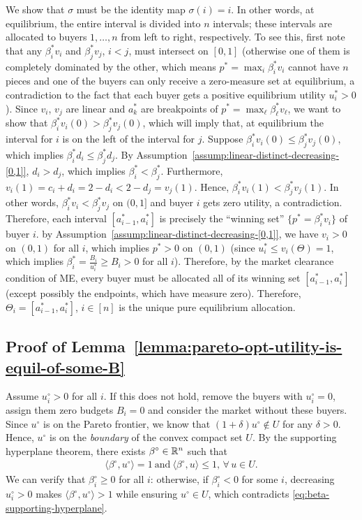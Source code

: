 		We show that $\sigma$ must be the identity map $\sigma(i) = i$. In other words, at equilibrium, the entire interval is divided into $n$ intervals; these intervals are allocated to buyers $1, \dots, n$ from left to right, respectively. To see this, first note that any $\beta^*_i v_i$ and $\beta^*_j v_j$, $i < j$, must intersect on $[0,1]$ (otherwise one of them is completely dominated by the other, which means $p^* = \max_i \beta^*_i v_i$ cannot have $n$ pieces and one of the buyers can only receive a zero-measure set at equilibrium, a contradiction to the fact that each buyer gets a positive equilibrium utility $u^*_i > 0$). 
		Since $v_i$, $v_j$ are linear and $a^*_k$ are breakpoints of $p^* = \max_\ell \beta^*_\ell v_\ell$, we want to show that $\beta^*_i v_i(0) > \beta^*_j v_j(0)$, which will imply that, at equilibrium the interval for $i$ is on the left of the interval for $j$. 
		Suppose $\beta^*_i v_i(0) \leq \beta^*_j v_j(0)$, which implies $\beta^*_i d_i \leq \beta^*_j d_j$. By Assumption~\ref{assump:linear-distinct-decreasing-[0,1]}, $d_i > d_j$, which implies $\beta^*_i < \beta^*_j$. Furthermore, $v_i(1) = c_i + d_i = 2- d_i < 2 - d_j = v_j(1)$.
		Hence, 
		$\beta^*_i v_i(1) < \beta^*_j v_j(1)$. 
		In other words, $\beta^*_i v_i < \beta^*_j v_j$ on $(0, 1]$ and buyer $i$ gets zero utility, a contradiction.
		Therefore, each interval $[a^*_{i-1}, a^*_i]$ is precisely the ``winning set'' $\{p^* = \beta^*_i v_i\}$ of buyer $i$. by Assumption~\ref{assump:linear-distinct-decreasing-[0,1]}, we have $v_i > 0$ on $(0,1)$ for all $i$, which implies $p^* > 0$ on $(0,1)$ (since $u^*_i \leq v_i(\Theta)=1$, which implies $\beta^*_i = \frac{B_i}{u^*_i} \geq B_i > 0$ for all $i$). Therefore, by the market clearance condition of ME, every buyer must be allocated all of its winning set $[a^*_{i-1}, a^*_i]$ (except possibly the endpoints, which have measure zero). 
		Therefore, $\Theta_i = [a^*_{i-1}, a^*_i]$, $i\in [n]$ is the unique pure equilibrium allocation. 
	

		\subsection*{Proof of Lemma~\ref{lemma:pareto-opt-utility-is-equil-of-some-B}}
		Assume $u^\circ_i>0$ for all $i$. 
	If this does not hold, remove the buyers with $u^\circ_i=0$, assign them zero budgets $B_i = 0$ and consider the market without these buyers. 
	Since $u^\circ$ is on the Pareto frontier, we know that $(1+\delta)u^\circ\notin U$ for any $\delta>0$. Hence, $u^\circ$ is on the \emph{boundary} of the convex compact set $U$. By the supporting hyperplane theorem, there exists $\beta^\circ\in \mathbb{R}^n$ such that 
	\begin{align}
		\langle \beta^\circ, u^\circ \rangle = 1\ \text{and}\ \langle \beta^\circ, u\rangle \leq 1,\, \forall\, u\in U.
		\label{eq:beta-supporting-hyperplane}
	\end{align}
	We can verify that $\beta^\circ_i \geq 0$ for all $i$: otherwise, if $\beta^\circ_i < 0$ for some $i$, decreasing $u^\circ_i >0$ makes $\langle \beta^\circ, u^\circ \rangle > 1$ while ensuring $u^\circ\in U$, which contradicts \eqref{eq:beta-supporting-hyperplane}.

